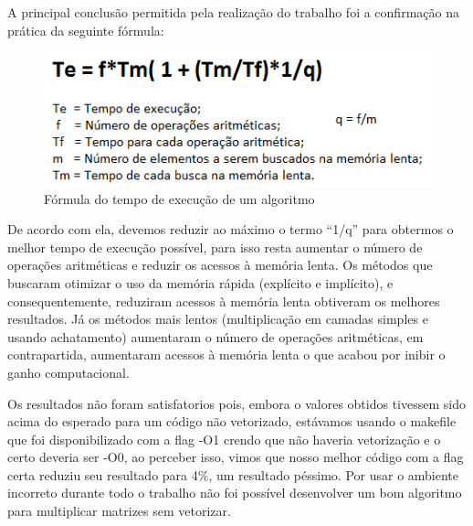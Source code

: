 \documentclass[a4paper, 10pt]{article}
\begin{document}
A principal conclusão permitida pela realização do trabalho foi a confirmação na prática da seguinte fórmula:
\begin{figure}[!h]
\centering
\includegraphics[scale=0.7]{formula}
\caption{Fórmula do tempo de execução de um algoritmo}
\label{Fórmula}
\end{figure}

De acordo com ela, devemos reduzir ao máximo o termo “1/q” para obtermos o melhor tempo de execução possível, para isso resta aumentar o número de operações aritméticas e reduzir os acessos à memória lenta. Os métodos que buscaram otimizar o uso da memória rápida (explícito e implícito), e consequentemente, reduziram acessos à memória lenta obtiveram os melhores resultados. Já os métodos mais lentos (multiplicação em camadas simples e usando achatamento) aumentaram o número de operações aritméticas, em contrapartida, aumentaram acessos à memória lenta o que acabou por inibir o ganho computacional.

Os resultados não foram satisfatorios pois, embora o valores obtidos tivessem sido acima do esperado para um código não vetorizado, estávamos usando o makefile que foi disponibilizado com a flag -O1 crendo que não haveria vetorização e o certo deveria ser -O0, ao perceber isso, vimos que nosso melhor código com a flag certa reduziu seu resultado para 4\%, um resultado péssimo. Por usar o ambiente incorreto durante todo o trabalho não foi possível desenvolver um bom algoritmo para multiplicar matrizes sem vetorizar.
\end{document}
